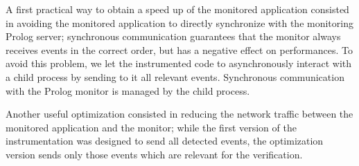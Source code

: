A first practical way to obtain a speed up of the monitored application consisted in
avoiding the monitored application to directly synchronize with the monitoring Prolog server;
synchronous communication guarantees that the monitor always receives events in the correct order,
but has a negative effect on performances. To avoid this problem, we let the instrumented code
to asynchronously interact with a child process by sending to it all relevant events. Synchronous
communication with the Prolog  monitor is managed by the child process.

Another useful optimization consisted in reducing the network traffic 
between the monitored application and the monitor; while
the first version of the instrumentation was designed to send
all detected events, the optimization version sends only those events 
which are relevant for the verification.


